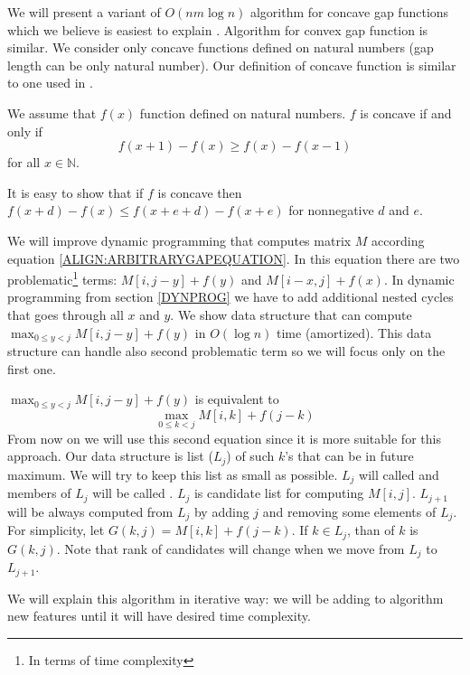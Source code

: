 We will present a variant of $O(nm\log n)$ algorithm for concave gap functions which
we believe is easiest to explain . Algorithm for convex gap function is similar.
We consider only concave functions defined on natural numbers (gap length can be only
natural number). Our definition of concave function is similar to one used in
\cite{GusfieldBook}.

\begin{definition}
We assume that $f(x)$ function defined on natural numbers. $f$
is concave if and only if 
\[f(x+1)-f(x)\geq f(x)-f(x-1)\]
for all $x\in\mathbb{N}$.
\end{definition}
\begin{note}
It is easy to show that if $f$ is concave then $f(x+d)-f(x) \leq f(x+e+d) -
f(x+e)$ for nonnegative $d$ and $e$.
\end{note}

We will improve dynamic programming that computes matrix $M$ according equation
\ref{ALIGN:ARBITRARYGAPEQUATION}. In this equation there are two
problematic\footnote{In terms of time complexity} terms: $M[i,j-y]+f(y)$ and
$M[i-x,j]+f(x)$. In dynamic programming from section \ref{DYNPROG} we  have
to add additional nested cycles that goes through all $x$ and $y$. We show data
structure that can compute $\max_{0\leq y < j}M[i,j-y]+f(y)$ in $O(\log n)$ time
(amortized). This data structure can handle also second problematic term so we
will focus only on the first one.

$\max_{0\leq y < j}M[i,j-y]+f(y)$ is equivalent to
\begin{equation}
\max_{0\leq k < j}M[i,k]+f(j-k)\label{CONVEX:MAXFUNCTION}
\end{equation}
From now on we will use this second equation since it is more suitable for this
approach.  Our data structure is list ($L_j$) of such $k$'s that can be in
future maximum. We will try to keep this list as small as possible. $L_j$ will
called  and members of $L_j$ will be called
. $L_j$ is candidate list for computing $M[i,j]$.
$L_{j+1}$ will be always computed from $L_j$ by adding $j$ and removing some
elements of $L_j$. For simplicity, let $G(k,j) = M[i,k]+f(j-k)$. If $k\in L_j$,
than  of $k$ is $G(k,j)$. Note that rank of candidates will
change when we move from $L_j$ to $L_{j+1}$.

We will explain this algorithm in iterative way: we will be adding to algorithm
new features until it will have desired time complexity. 

